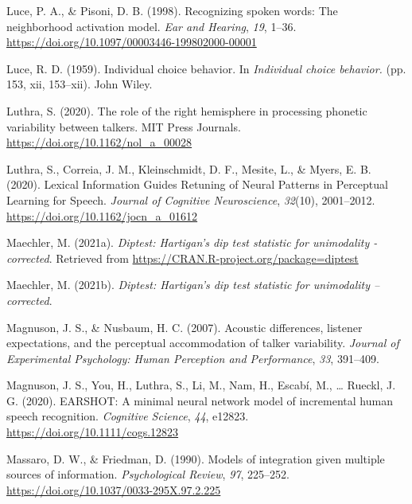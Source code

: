 \documentclass[
  11pt,
  english,
  man,floatsintext]{apa6}
\newlength{\cslhangindent}
\newlength{\cslentryspacingunit} %
\newenvironment{CSLReferences}[2] %
 {%
  \setlength{\parindent}{0pt}
  \ifodd #1
  \let\oldpar\par
  \def\par{\hangindent=\cslhangindent\oldpar}
  \fi
  \setlength{\parskip}{#2\cslentryspacingunit}
 }%
 {}
\begin{document}
\begin{CSLReferences}{1}{0}
\leavevmode{}%
Luce, P. A., \& Pisoni, D. B. (1998). Recognizing spoken words: The neighborhood activation model. \emph{Ear and Hearing}, \emph{19}, 1--36. \url{https://doi.org/10.1097/00003446-199802000-00001}

\leavevmode{}%
Luce, R. D. (1959). Individual choice behavior. In \emph{Individual choice behavior.} (pp. 153, xii, 153--xii). John Wiley.

\leavevmode{}%
Luthra, S. (2020). The role of the right hemisphere in processing phonetic variability between talkers. MIT Press Journals. \url{https://doi.org/10.1162/nol_a_00028}

\leavevmode{}%
Luthra, S., Correia, J. M., Kleinschmidt, D. F., Mesite, L., \& Myers, E. B. (2020). {Lexical Information Guides Retuning of Neural Patterns in Perceptual Learning for Speech}. \emph{Journal of Cognitive Neuroscience}, \emph{32}(10), 2001--2012. \url{https://doi.org/10.1162/jocn_a_01612}

\leavevmode{}%
Maechler, M. (2021a). \emph{Diptest: Hartigan's dip test statistic for unimodality - corrected}. Retrieved from \url{https://CRAN.R-project.org/package=diptest}

\leavevmode{}%
Maechler, M. (2021b). \emph{Diptest: Hartigan's dip test statistic for unimodality -- corrected}.

\leavevmode{}%
Magnuson, J. S., \& Nusbaum, H. C. (2007). Acoustic differences, listener expectations, and the perceptual accommodation of talker variability. \emph{Journal of Experimental Psychology: Human Perception and Performance}, \emph{33}, 391--409.

\leavevmode{}%
Magnuson, J. S., You, H., Luthra, S., Li, M., Nam, H., Escabí, M., \ldots{} Rueckl, J. G. (2020). EARSHOT: A minimal neural network model of incremental human speech recognition. \emph{Cognitive Science}, \emph{44}, e12823. \url{https://doi.org/10.1111/cogs.12823}

\leavevmode{}%
Massaro, D. W., \& Friedman, D. (1990). Models of integration given multiple sources of information. \emph{Psychological Review}, \emph{97}, 225--252. \url{https://doi.org/10.1037/0033-295X.97.2.225}


\end{CSLReferences}
\end{document}

